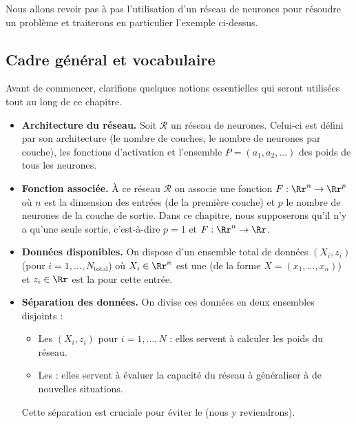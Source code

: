 Nous allons revoir pas à pas l'utilisation d'un réseau de neurones pour résoudre un problème et traiterons en particulier l'exemple ci-dessus.

\subsection{Cadre général et vocabulaire}

Avant de commencer, clarifions quelques notions essentielles qui seront utilisées tout au long de ce chapitre.

\begin{itemize}
	\item \textbf{Architecture du réseau.} Soit $\mathcal{R}$ un réseau de neurones. Celui-ci est défini par son architecture (le nombre de couches, le nombre de neurones par couche), les fonctions d'activation et l'ensemble $P = (a_1,a_2,\ldots)$ des poids de tous les neurones.
	
	\item \textbf{Fonction associée.} \`A ce réseau $\mathcal{R}$ on associe une fonction $F : \Rr^n \to \Rr^p$ où $n$ est la dimension des entrées (de la première couche) et $p$ le nombre de neurones de la couche de sortie.
	Dans ce chapitre, nous supposerons qu'il n'y a qu'une seule sortie, c'est-à-dire $p=1$ et $F : \Rr^n \to \Rr$.
	
	
	\item \textbf{Données disponibles.} On dispose d'un ensemble total de données $(X_i,z_i)$ (pour $i=1,\ldots,N_{\text{total}}$) où $X_i \in \Rr^n$ est une  (de la forme $X=(x_1,\ldots,x_n)$) et $z_i \in \Rr$ est la  pour cette entrée.
	
	\item \textbf{Séparation des données.} On divise ces données en deux ensembles disjoints :
	\begin{itemize}
		\item Les  $(X_i,z_i)$ pour $i=1,\ldots,N$ : elles servent à calculer les poids du réseau.
		\item Les  : elles servent à évaluer la capacité du réseau à généraliser à de nouvelles situations.
	\end{itemize}
	Cette séparation est cruciale pour éviter le  (nous y reviendrons).
	

\end{itemize}
